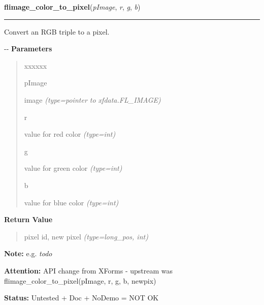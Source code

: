 \hspace{.8\funcindent}\begin{boxedminipage}{\funcwidth}

    \raggedright \textbf{flimage\_color\_to\_pixel}(\textit{pImage}, \textit{r}, \textit{g}, \textit{b})

    \vspace{-1.5ex}

    \rule{\textwidth}{0.5\fboxrule}
\setlength{\parskip}{2ex}

Convert an RGB triple to a pixel.

-{}-
\setlength{\parskip}{1ex}
      \textbf{Parameters}
      \vspace{-1ex}

      \begin{quote}
        \begin{Ventry}{xxxxxx}

          \item[pImage]


image
            {\it (type=pointer to xfdata.FL\_IMAGE)}

          \item[r]


value for red color
            {\it (type=int)}

          \item[g]


value for green color
            {\it (type=int)}

          \item[b]


value for blue color
            {\it (type=int)}

        \end{Ventry}

      \end{quote}

      \textbf{Return Value}
    \vspace{-1ex}

      \begin{quote}

pixel id, new pixel
      {\it (type=long\_pos, int)}

      \end{quote}

\textbf{Note:} 
e.g. \emph{todo}


\textbf{Attention:} 
API change from XForms - upstream was
flimage\_color\_to\_pixel(pImage, r, g, b, newpix)


\textbf{Status:} 
Untested + Doc + NoDemo = NOT OK


    \end{boxedminipage}

